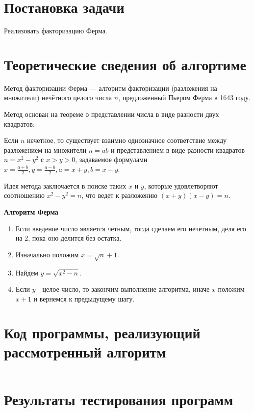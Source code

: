 \documentclass[spec, och, labwork]{shiza}
\begin{document}
\tableofcontents

\section{Постановка задачи}

Реализовать факторизацию Ферма.

\section{Теоретические сведения об алгортиме}
Метод факторизации Ферма — алгоритм факторизации (разложения на множители) 
нечётного целого числа $n$, предложенный Пьером Ферма в 1643 году.

Метод основан на теореме о представлении числа в виде разности двух квадратов:

Если $n$ нечетное, то существует взаимно однозначное соответствие между
разложением на множители $n = ab$ и представлением в виде разности квадратов
$n = x^2 - y^2$ с $x > y > 0$, задаваемое формулами $x = \frac{a+b}{2}, 
y = \frac{a-b}{2}, a = x + y, b = x - y$.

Идея метода заключается в поиске таких $x$ и $y$, которые удовлетворяют 
соотношению $x^2 - y^2 = n$, что ведет к разложению $(x + y)(x - y) = n$.

\textbf{Алгоритм Ферма}
\begin{enumerate}
    \item Если введеное число является четным, тогда сделаем его нечетным, 
    деля его на 2, пока оно делится без остатка.
    \item Изначально положим $x = \sqrt{n} + 1$. 
    \item Найдем $y = \sqrt{x^2 - n}$.
    \item Если $y$ - целое число, то закончим выполнение алгоритма, иначе 
    $x$ положим $x + 1$ и вернемся к предыдущему шагу.
\end{enumerate}

\section{Код программы, реализующий рассмотренный алгоритм}

   \inputminted[fontsize=\small]{scala}{../code/task11.scala}
    
\section{Результаты тестирования программ}
\end{document}
